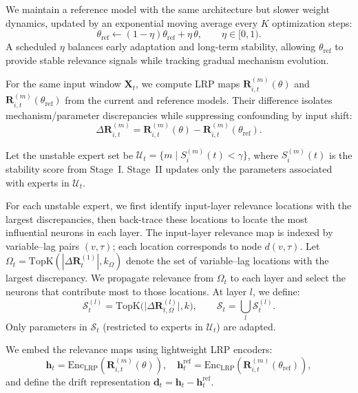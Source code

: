 ﻿\documentclass[journal]{IEEEtran}
\begin{document}
We maintain a reference model with the same architecture but slower weight dynamics, updated by an exponential moving average every $K$ optimization steps:
\begin{equation}
\theta_{\mathrm{ref}} \leftarrow (1-\eta)\theta_{\mathrm{ref}} + \eta\,\theta,\qquad \eta\in[0,1).
\end{equation}
A scheduled $\eta$ balances early adaptation and long-term stability, allowing $\theta_{\mathrm{ref}}$ to provide stable relevance signals while tracking gradual mechanism evolution.

For the same input window $\mathbf{X}_t$, we compute LRP maps $\mathbf{R}_{i,t}^{(m)}(\theta)$ and $\mathbf{R}_{i,t}^{(m)}(\theta_{\mathrm{ref}})$ from the current and reference models. Their difference isolates mechanism/parameter discrepancies while suppressing confounding by input shift:
\begin{equation}
\Delta \mathbf{R}_{i,t}^{(m)} = \mathbf{R}_{i,t}^{(m)}(\theta)-\mathbf{R}_{i,t}^{(m)}(\theta_{\mathrm{ref}}).
\end{equation}

Let the unstable expert set be $\mathcal{U}_t=\{m \mid S_i^{(m)}(t) < \gamma\}$, where $S_i^{(m)}(t)$ is the stability score from Stage~I. Stage~II updates only the parameters associated with experts in $\mathcal{U}_t$.

For each unstable expert, we first identify input-layer relevance locations with the largest discrepancies, then back-trace these locations to locate the most influential neurons in each layer. The input-layer relevance map is indexed by variable--lag pairs $(v,\tau)$; each location corresponds to node $d(v,\tau)$. Let $\Omega_t=\mathrm{TopK}(|\Delta \mathbf{R}^{(1)}_t|,k_{\Omega})$ denote the set of variable--lag locations with the largest discrepancy. We propagate relevance from $\Omega_t$ to each layer and select the neurons that contribute most to those locations. At layer $l$, we define:
\begin{equation}
\mathcal{S}_t^{(l)}=\mathrm{TopK}\Big(\big|\Delta \mathbf{R}^{(l)}_{t,\Omega}\big|,k\Big),\qquad
\mathcal{S}_t=\bigcup_l \mathcal{S}_t^{(l)}.
\end{equation}
Only parameters in $\mathcal{S}_t$ (restricted to experts in $\mathcal{U}_t$) are adapted.

We embed the relevance maps using lightweight LRP encoders:
\begin{equation}
\mathbf{h}_{t}=\mathrm{Enc}_{\mathrm{LRP}}\!\left(\mathbf{R}_{i,t}^{(m)}(\theta)\right),\quad
\mathbf{h}^{\mathrm{ref}}_{t}=\mathrm{Enc}_{\mathrm{LRP}}\!\left(\mathbf{R}_{i,t}^{(m)}(\theta_{\mathrm{ref}})\right),
\end{equation}
and define the drift representation $\mathbf{d}_t=\mathbf{h}_{t}-\mathbf{h}^{\mathrm{ref}}_{t}$.
\end{document}
